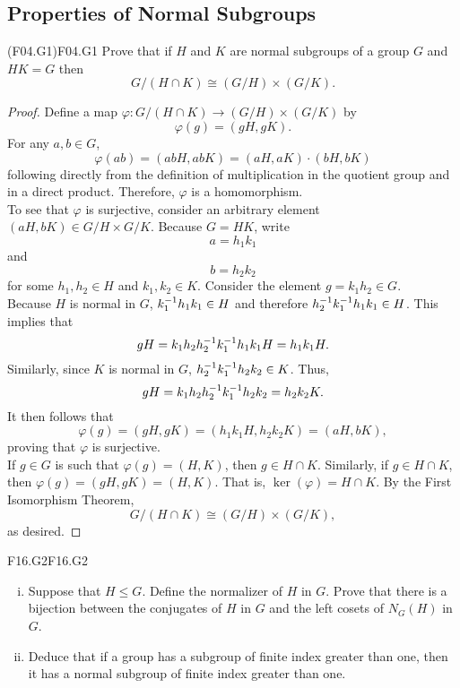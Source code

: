 \documentclass[../AlgebraQualSolutions.tex]{subfiles}
\begin{document}
\subsection{Properties of Normal Subgroups}

\begin{prob}{(F04.G1)}{F04.G1}
	Prove that if $H$ and $K$ are normal subgroups of a group $G$ and $HK = G$ then	
		\[G/(H \cap K) \cong (G/H) \times (G/K).\]
\end{prob}

\begin{proof}
	Define a map $\varphi: G/(H \cap K) \to (G/H) \times (G/K)$ by 
		\[\varphi(g) = (gH,gK).\]
	For any $a,b \in G$,
		\[\varphi(ab) = (abH, abK) = (aH,aK)\cdot(bH,bK)\]
	following directly from the definition of multiplication in the quotient group and in a direct product. Therefore, $\varphi$ is a homomorphism.\\

	To see that $\varphi$ is surjective, consider an arbitrary element $(aH,bK) \in G/H \times G/K$. Because $G = HK$, write
		\[a = h_1k_1\]
	and
		\[b = h_2k_2\]
	for some $h_1,h_2 \in H$ and $k_1,k_2 \in K$. Consider the element $g = k_1 h_2 \in G$.\\

	Because $H$ is normal in $G$, $k_1^{-1} h_1 k_1 \in H$ and therefore $h_2^{-1} k_1^{-1} h_1 k_1 \in H$. This implies that
		\[g H = k_1h_2h_2^{-1} k_1^{-1} h_1 k_1 H = h_1 k_1 H.\]
	Similarly, since $K$ is normal in $G$, $h_2^{-1} k_1^{-1} h_2k_2 \in K$. Thus,
		\[g H = k_1h_2 h_2^{-1} k_1^{-1} h_2k_2 = h_2 k_2 K. \]
	It then follows that
		\[\varphi(g) = (gH, gK) = (h_1 k_1 H,  h_2 k_2 K) = (aH, bK),\]
	proving that $\varphi$ is surjective.\\

	If $g \in G$ is such that $\varphi(g) = (H,K)$, then $g \in H \cap K$. Similarly, if $g \in H \cap K$, then $\varphi(g) = (gH,gK) = (H,K)$. That is, $\ker(\varphi) = H \cap K$. By the First Isomorphism Theorem,
		\[G/(H \cap K) \cong (G/H) \times (G/K),\]
	as desired.
\end{proof}

	\begin{prob}{F16.G2}{F16.G2}
		\begin{enumerate}[(i)]
			\item Suppose that $H \leq G$. Define the normalizer of $H$ in $G$. Prove that there is a bijection between the conjugates of $H$ in $G$ and the left cosets of $N_G(H)$ in $G$.
			\item Deduce that if a group has a subgroup of finite index greater than one, then it has a normal subgroup of finite index greater than one.
		\end{enumerate}
	\end{prob}
\end{document}
